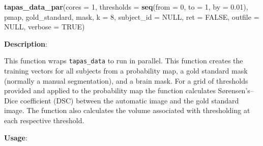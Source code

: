 \documentclass[]{article}
\newenvironment{Shaded}{\begin{snugshade}}{\end{snugshade}}
\newcommand{\DataTypeTok}[1]{\textcolor[rgb]{0.13,0.29,0.53}{#1}}
\newcommand{\DecValTok}[1]{\textcolor[rgb]{0.00,0.00,0.81}{#1}}
\newcommand{\FloatTok}[1]{\textcolor[rgb]{0.00,0.00,0.81}{#1}}
\newcommand{\KeywordTok}[1]{\textcolor[rgb]{0.13,0.29,0.53}{\textbf{#1}}}
\newcommand{\NormalTok}[1]{#1}
\newcommand{\OtherTok}[1]{\textcolor[rgb]{0.56,0.35,0.01}{#1}}
\begin{document}
\begin{Shaded}
\begin{Highlighting}[]
\KeywordTok{tapas_data_par}\NormalTok{(}\DataTypeTok{cores =} \DecValTok{1}\NormalTok{,}
               \DataTypeTok{thresholds =} \KeywordTok{seq}\NormalTok{(}\DataTypeTok{from =} \DecValTok{0}\NormalTok{, }\DataTypeTok{to =} \DecValTok{1}\NormalTok{, }\DataTypeTok{by =} \FloatTok{0.01}\NormalTok{),}
\NormalTok{               pmap,}
\NormalTok{               gold_standard,}
\NormalTok{               mask,}
               \DataTypeTok{k =} \DecValTok{8}\NormalTok{,}
               \DataTypeTok{subject_id =} \OtherTok{NULL}\NormalTok{,}
               \DataTypeTok{ret =} \OtherTok{FALSE}\NormalTok{,}
               \DataTypeTok{outfile =} \OtherTok{NULL}\NormalTok{,}
               \DataTypeTok{verbose =} \OtherTok{TRUE}\NormalTok{)}
\end{Highlighting}
\end{Shaded}

\textbf{Description}:

This function wraps \texttt{tapas\_data} to run in parallel. This
function creates the training vectors for all subjects from a
probability map, a gold standard mask (normally a manual segmentation),
and a brain mask. For a grid of thresholds provided and applied to the
probability map the function calculates Sørensen's--Dice coefficient
(DSC) between the automatic image and the gold standard image. The
function also calculates the volume associated with thresholding at each
respective threshold.

\textbf{Usage}:
\end{document}

